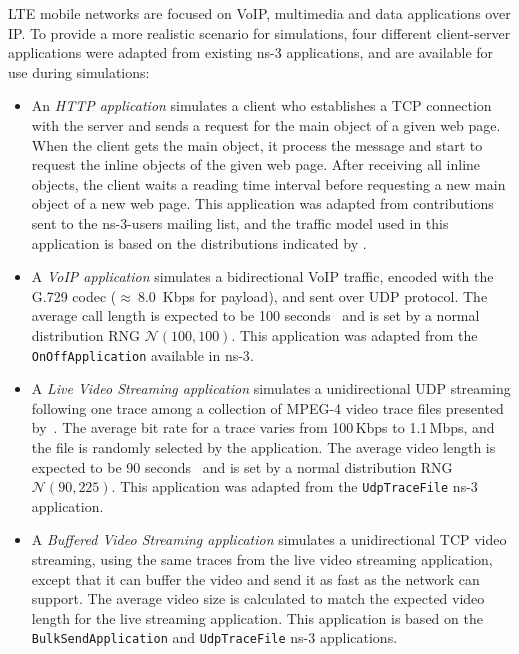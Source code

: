 \ac{LTE} mobile networks are focused on \ac{VoIP}, multimedia and data
applications over \ac{IP}. To provide a more realistic scenario for
simulations, four different client-server applications were adapted from
existing \ac{ns-3} applications, and are available for use during simulations:
\begin{itemize}
  \item An \emph{\ac{HTTP} application} simulates a client who establishes a
  \ac{TCP} connection with the server and sends a request for the main object
  of a given web page. When the client gets the main object, it process the
  message and start to request the inline objects of the given web page. After
  receiving all inline objects, the client waits a reading time interval before
  requesting a new main object of a new web page. This application was adapted
  from contributions sent to the ns-3-users mailing list, and the traffic model
  used in this application is based on the distributions indicated by
  \citet{Pries2012}.

  \item A \emph{\ac{VoIP} application} simulates a bidirectional \ac{VoIP}
  traffic, encoded with the G.729 codec ($\approx~8.0$~Kbps for payload), and
  sent over \ac{UDP} protocol. The average call length is expected to be 100
  seconds~\cite{Guo2007, Melo2010} and is set by a normal distribution \ac{RNG}
  $\mathcal{N}(100,100)$. This application was adapted from the
  \texttt{OnOffApplication} available in \ac{ns-3}.

  \item A \emph{Live Video Streaming application} simulates a unidirectional
  \ac{UDP} streaming following one trace among a collection of \acs{MPEG}-4
  video trace files presented by~\citet{Fitzek2001}. The average bit rate for a
  trace varies from 100\,Kbps to 1.1\,Mbps, and the file is randomly selected
  by the application. The average video length is expected to be 90
  seconds~\cite{youtubeStats} and is set by a normal distribution \ac{RNG}
  $\mathcal{N}(90,225)$. This application was adapted from the
  \texttt{UdpTraceFile} \ac{ns-3} application.

  \item A \emph{Buffered Video Streaming application} simulates a
  unidirectional \ac{TCP} video streaming, using the same traces from the live
  video streaming application, except that it can buffer the video and send it
  as fast as the network can support. The average video size is calculated to
  match the expected video length for the live streaming application. This
  application is based on the \texttt{BulkSendApplication} and
  \texttt{UdpTraceFile} \ac{ns-3} applications.
\end{itemize}

